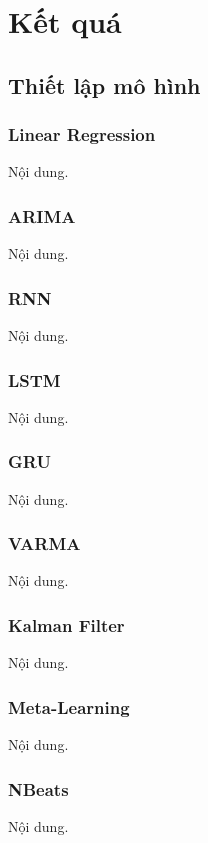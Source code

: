 \section{Kết quá}

\subsection{Thiết lập mô hình} 
\subsubsection{Linear Regression}
Nội dung.

\subsubsection{ARIMA}
Nội dung.

\subsubsection{RNN}
Nội dung.


\subsubsection{LSTM}
Nội dung.

\subsubsection{GRU}
Nội dung.


\subsubsection{VARMA}
Nội dung.


\subsubsection{Kalman Filter}
Nội dung.




\subsubsection{Meta-Learning}
Nội dung.





\subsubsection{NBeats}
Nội dung.




